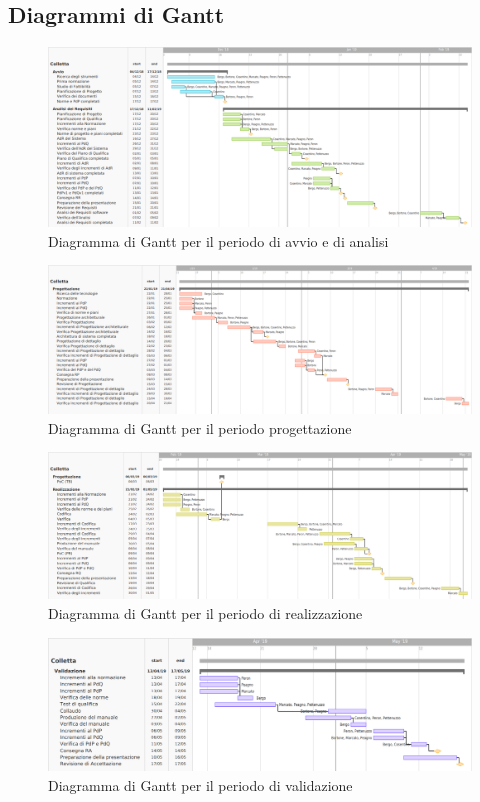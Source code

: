 \subsection{Diagrammi di Gantt}
\begin{figure}[hbt!]
	\centering
	\includegraphics[scale=0.45,angle=90]{images/ganttan.png}
	\caption{Diagramma di Gantt per il periodo di avvio e di analisi}
\end{figure}

\newpage
\begin{figure}[hbt!]
	\centering
	\includegraphics[scale=0.45,angle=90]{images/ganttprog.png}
	\caption{Diagramma di Gantt per il periodo progettazione}
\end{figure}

\newpage
\begin{figure}[hbt!]
	\centering
	\includegraphics[scale=0.45, angle=90]{images/ganttreal.png}
	\caption{Diagramma di Gantt per il periodo di realizzazione}
\end{figure}

\newpage
\begin{figure}[hbt!]
	\centering
	\includegraphics[scale=0.40, angle=90]{images/ganttval.png}
	\caption{Diagramma di Gantt per il periodo di validazione}
\end{figure}